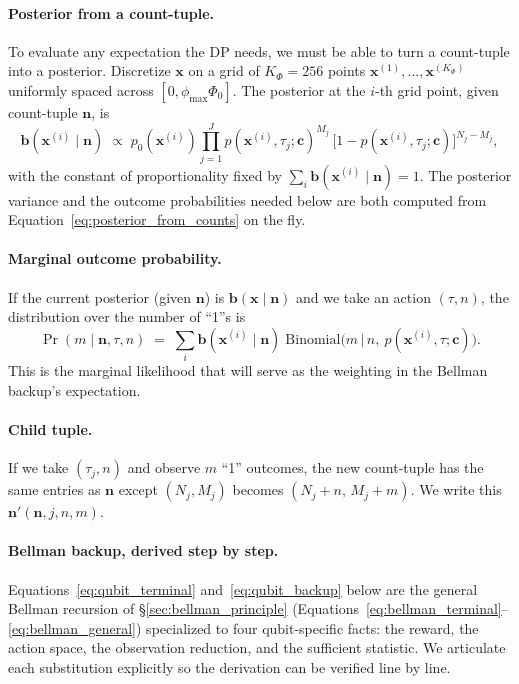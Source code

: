 \documentclass[11pt]{article}
\newcommand{\bc}{\bm{c}}
\newcommand{\bx}{\bm{x}}
\newcommand{\bb}{\bm{b}}
\begin{document}
\paragraph{Posterior from a count-tuple.}  To evaluate any expectation the DP needs, we must be able to turn a count-tuple into a posterior.  Discretize $\bx$ on a grid of $K_\Phi = 256$ points $\bx^{(1)}, \ldots, \bx^{(K_\Phi)}$ uniformly spaced across $[0, \phi_{\max} \Phi_0]$.  The posterior at the $i$-th grid point, given count-tuple $\mathbf{n}$, is
\begin{equation}
\bb(\bx^{(i)} \mid \mathbf{n}) \;\propto\; p_0(\bx^{(i)}) \prod_{j=1}^J p(\bx^{(i)}, \tau_j; \bc)^{M_j}\, \bigl[1 - p(\bx^{(i)}, \tau_j; \bc)\bigr]^{N_j - M_j},
\label{eq:posterior_from_counts}
\end{equation}
with the constant of proportionality fixed by $\sum_i \bb(\bx^{(i)} \mid \mathbf{n}) = 1$.  The posterior variance and the outcome probabilities needed below are both computed from Equation~\eqref{eq:posterior_from_counts} on the fly.

\paragraph{Marginal outcome probability.}  If the current posterior (given $\mathbf{n}$) is $\bb(\bx \mid \mathbf{n})$ and we take an action $(\tau, n)$, the distribution over the number of ``1''s is
\begin{equation}
\Pr(m \mid \mathbf{n}, \tau, n) \;=\; \sum_i \bb(\bx^{(i)} \mid \mathbf{n})\; \mathrm{Binomial}\bigl(m \,\big|\, n,\ p(\bx^{(i)}, \tau; \bc)\bigr).
\label{eq:marginal_outcome}
\end{equation}
This is the marginal likelihood that will serve as the weighting in the Bellman backup's expectation.

\paragraph{Child tuple.}  If we take $(\tau_j, n)$ and observe $m$ ``1'' outcomes, the new count-tuple has the same entries as $\mathbf{n}$ except $(N_j, M_j)$ becomes $(N_j + n,\, M_j + m)$.  We write this $\mathbf{n}'(\mathbf{n}, j, n, m)$.

\paragraph{Bellman backup, derived step by step.}  Equations~\eqref{eq:qubit_terminal} and~\eqref{eq:qubit_backup} below are the general Bellman recursion of \S\ref{sec:bellman_principle} (Equations~\eqref{eq:bellman_terminal}--\eqref{eq:bellman_general}) specialized to four qubit-specific facts: the reward, the action space, the observation reduction, and the sufficient statistic.  We articulate each substitution explicitly so the derivation can be verified line by line.
\end{document}
